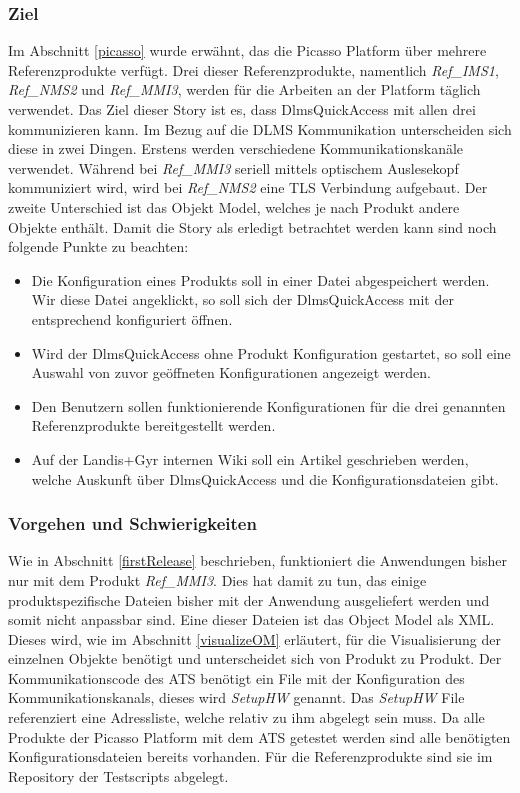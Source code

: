 \subsubsection{Ziel}
Im Abschnitt \ref{picasso} wurde erwähnt, das die Picasso Platform über mehrere Referenzprodukte verfügt.
Drei dieser Referenzprodukte, namentlich \textit{Ref\_IMS1}, \textit{Ref\_NMS2} und \textit{Ref\_MMI3}, werden für die Arbeiten an der Platform täglich verwendet.
Das Ziel dieser Story ist es, dass DlmsQuickAccess mit allen drei kommunizieren kann.
Im Bezug auf die \ac{DLMS} Kommunikation unterscheiden sich diese in zwei Dingen.
Erstens werden verschiedene Kommunikationskanäle verwendet. 
Während bei \textit{Ref\_MMI3} seriell mittels optischem Auslesekopf kommuniziert wird, wird bei \textit{Ref\_NMS2} eine \ac{TLS} Verbindung aufgebaut.
Der zweite Unterschied ist das Objekt Model, welches je nach Produkt andere Objekte enthält.
Damit die Story als erledigt betrachtet werden kann sind noch folgende Punkte zu beachten:
\begin{itemize}
   \item Die Konfiguration eines Produkts soll in einer Datei abgespeichert werden. Wir diese Datei angeklickt, so soll sich der DlmsQuickAccess mit der entsprechend konfiguriert öffnen. %
   \item Wird der DlmsQuickAccess ohne Produkt Konfiguration gestartet, so soll eine Auswahl von zuvor geöffneten Konfigurationen angezeigt werden.
   \item Den Benutzern sollen funktionierende Konfigurationen für die drei genannten Referenzprodukte bereitgestellt werden.
   \item Auf der Landis+Gyr internen Wiki soll ein Artikel geschrieben werden, welche Auskunft über DlmsQuickAccess und die Konfigurationsdateien gibt.
\end{itemize}

\subsubsection{Vorgehen und Schwierigkeiten}\label{s3configvorgehen}
Wie in Abschnitt \ref{firstRelease} beschrieben, funktioniert die Anwendungen bisher nur mit dem Produkt \textit{Ref\_MMI3}.
Dies hat damit zu tun, das einige produktspezifische Dateien bisher mit der Anwendung ausgeliefert werden und somit nicht anpassbar sind.
Eine dieser Dateien ist das Object Model als XML. 
Dieses wird, wie im Abschnitt \ref{visualizeOM} erläutert, für die Visualisierung der einzelnen Objekte benötigt und unterscheidet sich von Produkt zu Produkt.
Der Kommunikationscode des \ac{ATS} benötigt ein File mit der Konfiguration des Kommunikationskanals, dieses wird \textit{SetupHW} genannt.
Das \textit{SetupHW} File referenziert eine Adressliste, welche relativ zu ihm abgelegt sein muss.
Da alle Produkte der Picasso Platform mit dem \ac{ATS} getestet werden sind alle benötigten Konfigurationsdateien bereits vorhanden.
Für die Referenzprodukte sind sie im Repository der Testscripts abgelegt.

